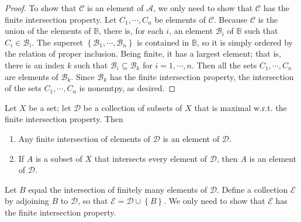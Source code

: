 \begin{proof}
  To show that \( \mathcal{C} \) is an element of \( \mathcal{A} \), we only need to show that \( \mathcal{C} \) has the finite intersection property.
  Let \( C_1, \cdots, C_n \) be elements of \( \mathcal{C} \).
  Because \( \mathcal{C} \) is the union of the elements of \( \mathbb{B} \), there is, for each \( i \), an element \( \mathcal{B}_i \) of \( \mathbb{B} \) such that \( C_i \in \mathcal{B}_i \).
  The superset \( \left\lbrace \mathcal{B}_1, \cdots, \mathcal{B}_n \right\rbrace \) is contained in \( \mathbb{B} \), so it is simply ordered by the relation of proper inclusion.
  Being finite, it has a largest element;
  that is, there is an index \( k \) such that \( \mathcal{B}_i \subseteq \mathcal{B}_k \) for \( i = 1, \cdots, n \).
  Then all the sets \( C_1, \cdots, C_n \) are elements of \( \mathcal{B}_k \).
  Since \( \mathcal{B}_k \) has the finite intersection property, the intersection of the sets \( C_1,\cdots, C_n \) is nonemtpy, as desired.
\end{proof}

\begin{lemma}
  Let \( X \) be a set;
  let \( \mathcal{D} \) be a collection of subsets of \( X \) that is maximal w.r.t. the finite intersection property.
  Then
  \begin{enumerate}
    \item Any finite intersection of elements of \( \mathcal{D} \) is an element of \( \mathcal{D} \).
    \item If \( A \) is a subset of \( X \) that intersects every element of \( \mathcal{D} \), then \( A \) is an element of \( \mathcal{D} \).
  \end{enumerate}
\end{lemma}
\begin{sketchproof}
    \item Let \( B \) equal the intersection of finitely many elements of \( \mathcal{D} \).
      Define a collection \( \mathcal{E} \) by adjoining \( B \) to \( \mathcal{D} \), so that \( \mathcal{E} = \mathcal{D} \cup \left\lbrace B \right\rbrace \).
      We only need to show that \( \mathcal{E} \) has the finite intersection property.
\end{sketchproof}

